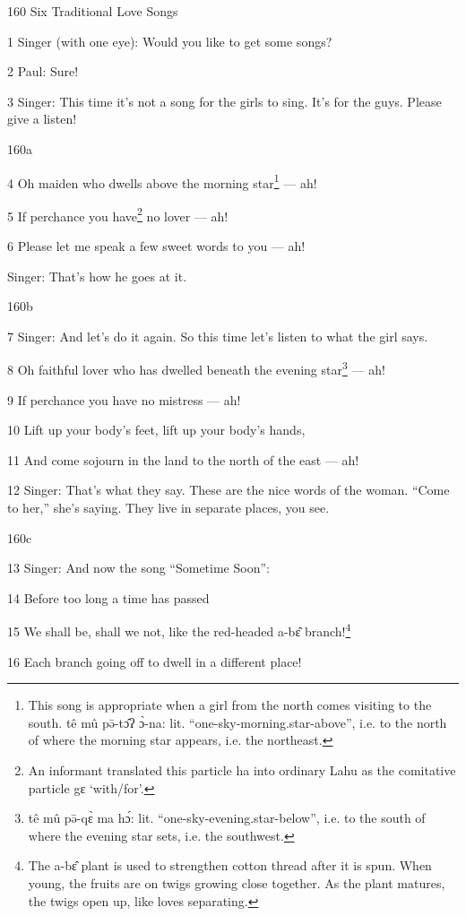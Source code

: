 
160 Six Traditional Love Songs

1 Singer (with one eye): Would you like to get some songs?

2 Paul: Sure!

3 Singer: This time it's not a song for the girls to sing. It's for the guys. Please
give a listen!

160a

4 Oh maiden who dwells above the morning star\footnote{This song is appropriate when a girl from the north comes visiting to the south.  tê mû pə̄-tɔ̂ʔ ɔ̀-na: lit. ``one-sky-morning.star-above'', i.e. to the north of where the morning star appears, i.e. the northeast.} --- ah!

5 If perchance you have\footnote{An informant translated this particle ha into ordinary Lahu as the comitative particle gɛ `with/for'.} no lover --- ah!

6 Please let me speak a few sweet words to you --- ah!

Singer: That's how he goes at it.

160b

7 Singer: And let's do it again. So this time let's listen to what the girl says.

8 Oh faithful lover who has dwelled beneath the evening star\footnote{tê mû pə̄-qɛ̀ ma hɔ́: lit. ``one-sky-evening.star-below'', i.e. to the south of where the evening star sets, i.e. the southwest.} --- ah!

9 If perchance you have no mistress --- ah!

10 Lift up your body's feet, lift up your body's hands,

11 And come sojourn in the land to the north of the east --- ah!

12 Singer: That's what they say. These are the nice words of the woman. ``Come
to her,'' she's saying. They live in separate places, you see.

160c

13 Singer: And now the song ``Sometime Soon'':

14 Before too long a time has passed

15 We shall be, shall we not, like the red-headed a-bɛ̂ branch!\footnote{The a-bɛ̂ plant is used to strengthen cotton thread after it is spun. When young, the fruits are on twigs growing close together. As the plant matures, the twigs open up, like loves separating.}

16 Each branch going off to dwell in a different place!

